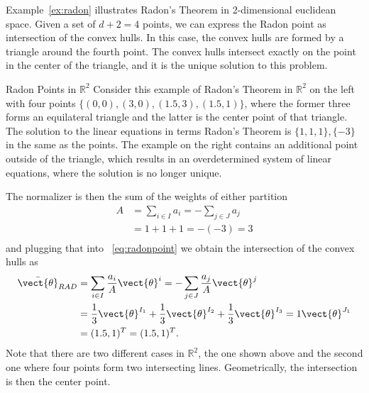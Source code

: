 Example~\ref{ex:radon} illustrates Radon's Theorem in 2-dimensional euclidean space.
Given a set of $d+2 =4$ points, we can express the Radon point as intersection of the convex hulls.
In this case, the convex hulls are formed by a triangle around the fourth point.
The convex hulls intersect exactly on the point in the center of the triangle, and it is the unique solution to this problem.

\begin{example}{Radon Points in $\mathbb{R}^2$}
    \label{ex:radon}
    Consider this example of Radon's Theorem in $\mathbb{R}^2$ on the left with four points $\{(0,0), (3,0), (1.5, 3), (1.5,1)\}$, where the former three forms an equilateral triangle and the latter is the center point of that triangle.
    The solution to the linear equations in terms Radon's Theorem is $\{1,1,1\},\{-3\}$ in the same as the points. 
    The example on the right contains an additional point outside of the triangle, which results in an overdetermined system of linear equations, where the solution is no longer unique.
    
     
    The normalizer is then the sum of the weights of either partition
    \begin{equation}
        \begin{split}
            A &= \sum_{i\in I} a_i = - \sum_{j \in J} a_j \\
            &= 1 + 1 + 1 = -(-3) = 3 \\
        \end{split}
    \end{equation}
    and plugging that into \eq~\ref{eq:radonpoint} we obtain the intersection of the convex hulls as
    \begin{equation}
        \begin{split}
            \bar{\vect{\theta}}_{RAD} &= \sum_{i\in I} \frac{a_i}{A} \vect{\theta}^i = - \sum_{j \in J} \frac{a_j}{A} \vect{\theta}^j \\
            &= \frac{1}{3} \vect{\theta}^{I_1} + \frac{1}{3} \vect{\theta}^{I_2} + \frac{1}{3} \vect{\theta}^{I_3} = 1 \vect{\theta}^{J_1} \\
            & =  (1.5, 1)^T = (1.5, 1)^T.
        \end{split}
    \end{equation}
    Note that there are two different cases in $\mathbb{R}^2$, the one shown above and the second one where four points form two intersecting lines. Geometrically, the intersection is then the center point.

\end{example}
   

